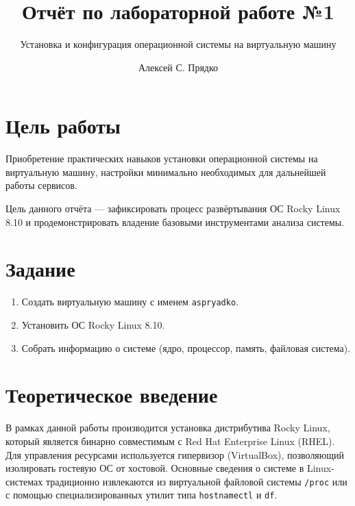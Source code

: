 \documentclass[
  english,
  russian,
  12pt,
  a4paper,
  DIV=11,
  numbers=noendperiod]{scrreprt}
\title{Отчёт по лабораторной работе №1}
\subtitle{Установка и конфигурация операционной системы на виртуальную
машину}
\author{Алексей С. Прядко}
\date{}
\providecommand{\tightlist}{%
  \setlength{\itemsep}{0pt}\setlength{\parskip}{0pt}}
\renewcommand*\contentsname{Содержание}
\newcommand\contentsname{Содержание}
\begin{document}
\maketitle

\renewcommand*\contentsname{Содержание}
{
\setcounter{tocdepth}{1}
\tableofcontents
}
\listoffigures
\listoftables

\chapter{Цель
работы}\label{ux446ux435ux43bux44c-ux440ux430ux431ux43eux442ux44b}

Приобретение практических навыков установки операционной системы на
виртуальную машину, настройки минимально необходимых для дальнейшей
работы сервисов.

Цель данного отчёта --- зафиксировать процесс развёртывания ОС Rocky
Linux 8.10 и продемонстрировать владение базовыми инструментами анализа
системы.

\chapter{Задание}\label{ux437ux430ux434ux430ux43dux438ux435}

\begin{enumerate}
\def\labelenumi{\arabic{enumi}.}
\tightlist
\item
  Создать виртуальную машину с именем \texttt{aspryadko}.
\item
  Установить ОС Rocky Linux 8.10.
\item
  Собрать информацию о системе (ядро, процессор, память, файловая
  система).
\end{enumerate}

\chapter{Теоретическое
введение}\label{ux442ux435ux43eux440ux435ux442ux438ux447ux435ux441ux43aux43eux435-ux432ux432ux435ux434ux435ux43dux438ux435}

В рамках данной работы производится установка дистрибутива Rocky Linux,
который является бинарно совместимым с Red Hat Enterprise Linux (RHEL).
Для управления ресурсами используется гипервизор (VirtualBox),
позволяющий изолировать гостевую ОС от хостовой. Основные сведения о
системе в Linux-системах традиционно извлекаются из виртуальной файловой
системы \texttt{/proc} или с помощью специализированных утилит типа
\texttt{hostnamectl} и \texttt{df}.
\end{document}
